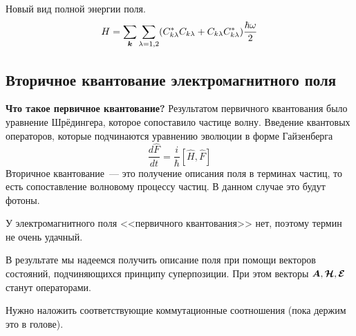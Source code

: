 Новый вид полной энергии поля.
$$
    H = \sum_{\bf k} \sum_{\lambda = 1, 2} (C_{k \lambda}^{\ast} C_{k \lambda} + C_{k \lambda} C_{k \lambda}^{\ast}) \dfrac{\hbar \omega}{2}
$$
\subsection{Вторичное квантование электромагнитного поля}
\textbf{Что такое первичное квантование?} Результатом первичного квантования было уравнение Шрёдингера, которое сопоставило частице волну. Введение квантовых операторов, которые подчинаются уравнению эволюции в форме Гайзенберга
$$
    \dfrac{d \hat F}{d t} = \dfrac{i}{\hbar} [\hat H, \hat F]
$$ 
Вторичное квантование~--- это получение описания поля в терминах частиц, то есть сопоставление волновому процессу частиц. В данном случае это будут фотоны.

У электромагнитного поля <<первичного квантования>> нет, поэтому термин не очень удачный.

В результате мы надеемся получить описание поля при помощи векторов состояний, подчиняющихся принципу суперпозиции. При этом векторы $\bf A, \bf \H, \bf \E$ станут операторами.

Нужно наложить соответствующие коммутационные соотношения (пока держим это в голове).

